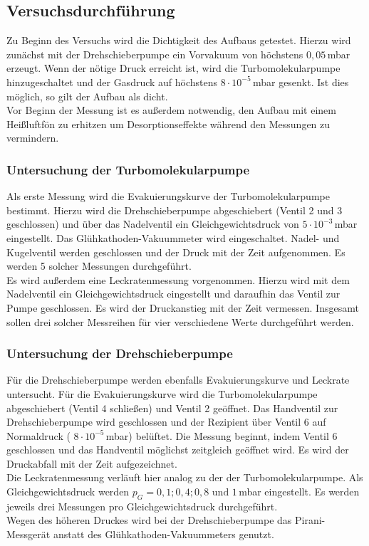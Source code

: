 \subsection{Versuchsdurchführung}
Zu Beginn des Versuchs wird die Dichtigkeit des Aufbaus getestet. Hierzu wird zunächst mit der Drehschieberpumpe ein Vorvakuum von höchstens $0,05$\,\si{\milli\bar} erzeugt. Wenn der nötige Druck erreicht
ist, wird die Turbomolekularpumpe hinzugeschaltet und der Gasdruck auf höchstens $8 \cdot 10^{-5}$\,\si{\milli\bar} gesenkt. Ist dies möglich, so gilt der Aufbau als dicht.\\
Vor Beginn der Messung ist es außerdem notwendig, den Aufbau mit einem Heißluftfön zu erhitzen um Desorptionseffekte während den Messungen zu vermindern.
\subsubsection{Untersuchung der Turbomolekularpumpe}
Als erste Messung wird die Evakuierungskurve der Turbomolekularpumpe bestimmt. Hierzu wird die Drehschieberpumpe abgeschiebert (Ventil 2 und 3 geschlossen) und über das Nadelventil ein Gleichgewichtsdruck von
$5 \cdot 10^{-3}$\,\si{\milli\bar} eingestellt. Das Glühkathoden-Vakuummeter wird eingeschaltet. Nadel- und Kugelventil werden geschlossen und der Druck mit der Zeit aufgenommen. Es werden 5 solcher Messungen
durchgeführt.\\
Es wird außerdem eine Leckratenmessung vorgenommen. Hierzu wird mit dem Nadelventil ein Gleichgewichtsdruck eingestellt und daraufhin das Ventil zur Pumpe geschlossen. Es wird
der Druckanstieg mit der Zeit vermessen. Insgesamt sollen drei solcher Messreihen für vier verschiedene Werte durchgeführt werden.
\subsubsection{Untersuchung der Drehschieberpumpe}
Für die Drehschieberpumpe werden ebenfalls Evakuierungskurve und Leckrate untersucht. Für die Evakuierungskurve wird die Turbomolekularpumpe abgeschiebert (Ventil 4 schließen) und Ventil 2 geöffnet.
Das Handventil zur Drehschieberpumpe wird geschlossen und der Rezipient über Ventil 6 auf Normaldruck ( $8 \cdot 10^{-5}$\,\si{\milli\bar}) belüftet. Die Messung beginnt, indem Ventil 6 geschlossen und das Handventil
möglichst zeitgleich geöffnet wird. Es wird der Druckabfall mit der Zeit aufgezeichnet.\\
Die Leckratenmessung verläuft hier analog zu der der Turbomolekularpumpe. Als Gleichgewichtsdruck werden  $p_G=0,1;0,4;0,8 \text{ und } 1 $\,\si{\milli\bar} eingestellt. Es werden jeweils drei Messungen
pro Gleichgewichtsdruck durchgeführt.\\
Wegen des höheren Druckes wird bei der Drehschieberpumpe das Pirani-Messgerät anstatt des Glühkathoden-Vakuummeters genutzt.
